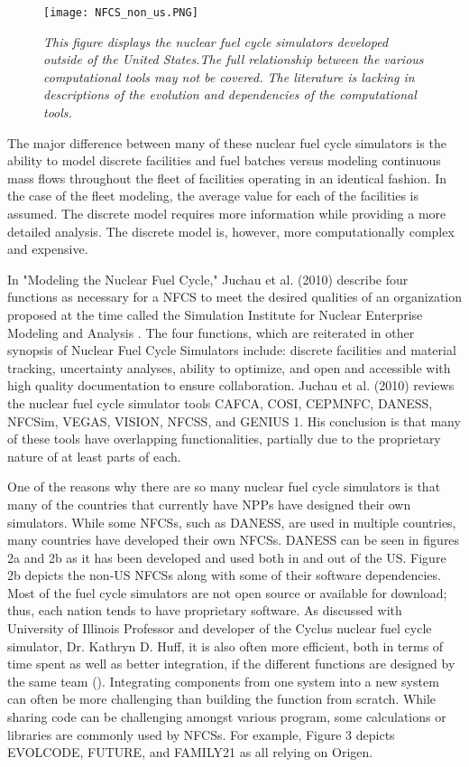 \documentclass{article}                                                                           %
\begin{document}
\begin{linenumbers}
\begin{subfigures}
\begin{figure}
\texttt{[image: NFCS\_non\_us.PNG]}
\caption{\small \sl This figure displays the nuclear fuel cycle simulators developed outside of the United States.The full relationship between the various computational tools may not be covered.  The literature is lacking in descriptions of the evolution and dependencies of the computational tools.}
\end{figure}
\end{subfigures}

The major difference between many of these nuclear fuel cycle simulators is the ability to model discrete facilities and fuel batches versus modeling continuous mass flows throughout the fleet of facilities operating in an identical fashion. In the case of the fleet modeling, the average value for each of the facilities is assumed. The discrete model requires more information while providing a more detailed analysis. The discrete model is, however, more computationally complex and expensive.

In "Modeling the Nuclear Fuel Cycle," Juchau et al. (2010) describe four functions as necessary for a NFCS to meet the desired qualities of an organization proposed at the time called the Simulation Institute for Nuclear Enterprise Modeling and Analysis \cite{Juchau2010}. The four functions, which are reiterated in other synopsis of Nuclear Fuel Cycle Simulators \cite{Wilson} include: discrete facilities and material tracking, uncertainty analyses, ability to optimize, and open and accessible with high quality documentation to ensure collaboration. Juchau et al. (2010) reviews the nuclear fuel cycle simulator tools CAFCA, COSI, CEPMNFC, DANESS, NFCSim, VEGAS, VISION, NFCSS, and GENIUS 1. His conclusion is that many of these tools have overlapping functionalities, partially due to the proprietary nature of at least parts of each.

One of the reasons why there are so many nuclear fuel cycle simulators is that many of the countries that currently have NPPs have designed their own simulators. While some NFCSs, such as DANESS, are used in multiple countries, many countries have developed their own NFCSs.  DANESS can be seen in figures 2a and 2b as it has been developed and used both in and out of the US. Figure 2b depicts the non-US NFCSs along with some of their software dependencies. Most of the fuel cycle simulators are not open source or available for download; thus, each nation tends to have proprietary software. As discussed with University of Illinois Professor and developer of the Cyclus nuclear fuel cycle simulator, Dr. Kathryn D. Huff, it is also often more efficient, both in terms of time spent as well as better integration, if the different functions are designed by the same team (\cite{redfoot_huff_2016}). Integrating components from one system into a new system can often be more challenging than building the function from scratch. While sharing code can be challenging amongst various program, some calculations or libraries are commonly used by NFCSs. For example, Figure 3 depicts EVOLCODE, FUTURE, and FAMILY21 as all relying on Origen.


\end{linenumbers}
\end{document}
